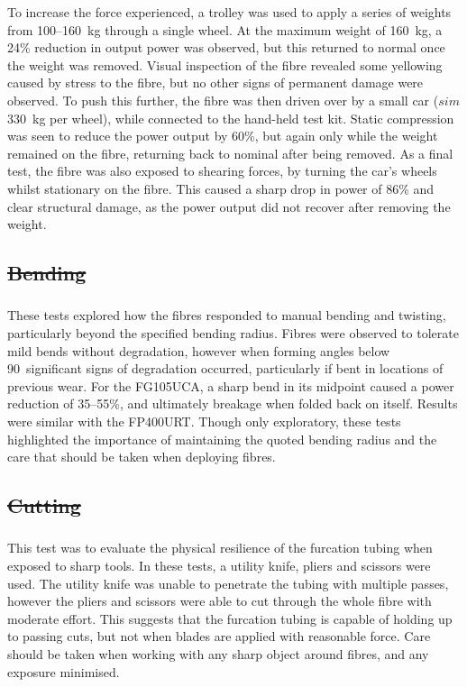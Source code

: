 \documentclass[a4paper,11pt]{article}
\providecommand{\DIFaddtex}[1]{{\protect\color{blue}\uwave{#1}}} %
\providecommand{\DIFdeltex}[1]{{\protect\color{red}\sout{#1}}}                      %
\providecommand{\DIFaddbegin}{} %
\providecommand{\DIFaddend}{} %
\providecommand{\DIFdelbegin}{} %
\providecommand{\DIFdelend}{} %
\providecommand{\DIFadd}[1]{\texorpdfstring{\DIFaddtex{#1}}{#1}} %
\providecommand{\DIFdel}[1]{\texorpdfstring{\DIFdeltex{#1}}{}} %
\newcommand{\DIFscaledelfig}{0.5}
\newlength{\DIFdelgraphicswidth} %
\newlength{\DIFdelgraphicsheight} %
\newcommand{\DIFaddincludegraphics}[2][]{{\color{blue}\fbox{\DIFOincludegraphics[#1]{#2}}}} %
\newcommand{\DIFdelincludegraphics}[2][]{%
\sbox{\DIFdelgraphicsbox}{\DIFOincludegraphics[#1]{#2}}%
\settoboxwidth{\DIFdelgraphicswidth}{\DIFdelgraphicsbox} %
\settoboxtotalheight{\DIFdelgraphicsheight}{\DIFdelgraphicsbox} %
\scalebox{\DIFscaledelfig}{%
\parbox[b]{\DIFdelgraphicswidth}{\usebox{\DIFdelgraphicsbox}\\[-\baselineskip] \rule{\DIFdelgraphicswidth}{0em}}\llap{\resizebox{\DIFdelgraphicswidth}{\DIFdelgraphicsheight}{%
\setlength{\unitlength}{\DIFdelgraphicswidth}%
\begin{picture}(1,1)%
\thicklines\linethickness{2pt} %
{\color[rgb]{1,0,0}\put(0,0){\framebox(1,1){}}}%
{\color[rgb]{1,0,0}\put(0,0){\line( 1,1){1}}}%
{\color[rgb]{1,0,0}\put(0,1){\line(1,-1){1}}}%
\end{picture}%
}\hspace*{3pt}}} %
} %
\DeclareRobustCommand{\DIFaddbegin}{\DIFOaddbegin \let\includegraphics\DIFaddincludegraphics} %
\DeclareRobustCommand{\DIFaddend}{\DIFOaddend \let\includegraphics\DIFOincludegraphics} %
\DeclareRobustCommand{\DIFdelbegin}{\DIFOdelbegin \let\includegraphics\DIFdelincludegraphics} %
\DeclareRobustCommand{\DIFdelend}{\DIFOaddend \let\includegraphics\DIFOincludegraphics} %
\begin{document}
To increase the force experienced, a trolley was used to apply a series of weights from 100--160~kg through a single wheel. At the maximum weight of 160~kg, a 24\% reduction in output power was observed, but this returned to normal once the weight was removed. Visual inspection of the fibre revealed some yellowing caused by stress to the fibre, but no other signs of permanent damage were observed. To push this further, the fibre was then driven over by a small car ($sim$330~kg per wheel), while connected to the hand-held test kit. Static compression was seen to reduce the power output by 60\%, but again only while the weight remained on the fibre, returning back to nominal after being removed. As a final test, the fibre was also exposed to shearing forces, by turning the car's wheels whilst stationary on the fibre. This caused a sharp drop in power of 86\% and clear structural damage, as the power output did not recover after removing the weight.

\DIFdelbegin \subsection{\DIFdel{Bending}}
\addtocounter{subsection}{-1}%
\DIFdelend \DIFaddbegin \subsubsection{\DIFadd{Bending}}
\DIFaddend These tests explored how the fibres responded to manual bending and twisting, particularly beyond the specified bending radius. Fibres were observed to tolerate mild bends without degradation, however when forming angles below 90\degree\ significant signs of degradation occurred, particularly if bent in locations of previous wear. For the FG105UCA, a sharp bend in its midpoint caused a power reduction of 35--55\%, and ultimately breakage when folded back on itself. Results were similar with the FP400URT. Though only exploratory, these tests highlighted the importance of maintaining the quoted bending radius and the care that should be taken when deploying fibres.

\DIFdelbegin \subsection{\DIFdel{Cutting}}
\addtocounter{subsection}{-1}%
\DIFdelend \DIFaddbegin \subsubsection{\DIFadd{Cutting}}
\DIFaddend This test was to evaluate the physical resilience of the furcation tubing when exposed to sharp tools. In these tests, a utility knife, pliers and scissors were used. The utility knife was unable to penetrate the tubing with multiple passes, however the pliers and scissors were able to cut through the whole fibre with moderate effort. This suggests that the furcation tubing is capable of holding up to passing cuts, but not when blades are applied with reasonable force. Care should be taken when working with any sharp object around fibres, and any exposure minimised.
\end{document}
